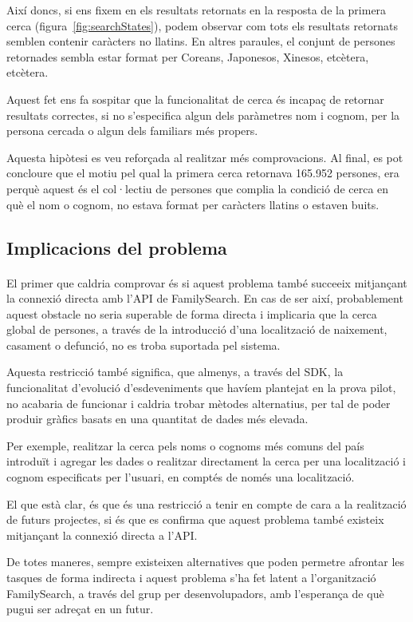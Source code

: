 Així doncs, si ens fixem en els resultats retornats en la resposta de la primera cerca (figura~\ref{fig:searchStates}), podem observar com tots els resultats retornats semblen contenir caràcters no llatins. En altres paraules, el conjunt de persones retornades sembla estar format per Coreans, Japonesos, Xinesos, etcètera, etcètera.

Aquest fet ens fa sospitar que la funcionalitat de cerca és incapaç de retornar resultats correctes, si no s'especifica algun dels paràmetres nom i cognom, per la persona cercada o algun dels familiars més propers.

Aquesta hipòtesi es veu reforçada al realitzar més comprovacions. Al final, es pot concloure que el motiu pel qual la primera cerca retornava 165.952 persones, era perquè aquest és el col·lectiu de persones que complia la condició de cerca en què el nom o cognom, no estava format per caràcters llatins o estaven buits.


\subsection{Implicacions del problema}

\paragraph{}
El primer que caldria comprovar és si aquest problema també succeeix mitjançant la connexió directa amb l'API de FamilySearch. En cas de ser així, probablement aquest obstacle no seria superable de forma directa i implicaria que la cerca global de persones, a través de la introducció d'una localització de naixement, casament o defunció, no es troba suportada pel sistema.

Aquesta restricció també significa, que almenys, a través del SDK, la funcionalitat d'evolució d'esdeveniments que havíem plantejat en la prova pilot, no acabaria de funcionar i caldria trobar mètodes alternatius, per tal de poder produir gràfics basats en una quantitat de dades més elevada.

Per exemple, realitzar la cerca pels noms o cognoms més comuns del país introduït i agregar les dades o realitzar directament la cerca per una localització i cognom especificats per l'usuari, en comptés de només una localització.

El que està clar, és que és una restricció a tenir en compte de cara a la rea\-lit\-za\-ció de futurs projectes, si és que es confirma que aquest problema també existeix mitjançant la connexió directa a l'API.

De totes maneres, sempre existeixen alternatives que poden permetre afrontar les tasques de forma indirecta i aquest problema s'ha fet latent a l'organització Family\-Search, a través del grup per desenvolupadors, amb l'esperança de què pugui ser adreçat en un futur.
